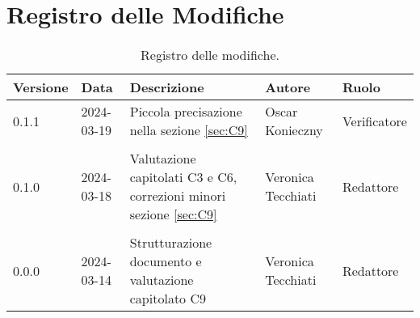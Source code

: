 \section*{Registro delle Modifiche}
\begin{table}[ht!]	
		\centering
		\begin{tabular}{p{1.2cm} p{2cm} p{6cm} p{3cm} p{2cm}}
			\toprule
			\textbf{Versione}& \textbf{Data} & \textbf{Descrizione} & \textbf{Autore} & \textbf{Ruolo} \\
			\midrule
				0.1.1 & 2024-03-19 & Piccola precisazione nella sezione \ref{sec:C9} & Oscar Konieczny & Verificatore
				\\\\ %
                0.1.0 & 2024-03-18 & Valutazione capitolati C3 e C6, correzioni minori sezione \ref{sec:C9} & Veronica Tecchiati & Redattore 
   				\\\\ %
				0.0.0 & 2024-03-14 & Strutturazione documento e valutazione capitolato C9 & Veronica Tecchiati & Redattore \\
			\bottomrule
		\end{tabular}
		\caption{Registro delle modifiche.}
		\label{table:Registro delle modifiche}
\end{table}